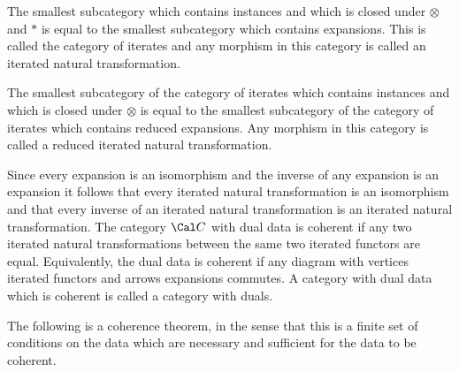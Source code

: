  The smallest subcategory which contains 
instances and which is closed under $\otimes$ and $*$ is equal to the smallest 
subcategory which contains expansions. This is called the category of iterates 
and any morphism in this category is called an iterated natural transformation.

\noindent The smallest subcategory of the category of iterates which contains 
instances and which is closed under $\otimes$ is equal to the smallest 
subcategory of the category of iterates which contains reduced expansions. Any 
morphism in this category is called a reduced iterated natural
transformation. \enddefinition 

 Since every expansion is an isomorphism
and the inverse of any expansion is an expansion it follows that
every iterated natural transformation is an isomorphism and that every
inverse of an iterated natural transformation
is an iterated natural transformation. The category ${\Cal C}$ with dual data
is coherent if any two iterated natural transformations between the same
two iterated functors are equal. Equivalently, the dual data is coherent if
any diagram with vertices iterated functors and arrows expansions commutes.
\enddefinition
A category with dual data which is coherent is called a category with duals.

The following is a coherence theorem, in the sense that this is a finite
set of conditions on the data which are necessary and sufficient
for the data to be coherent.

